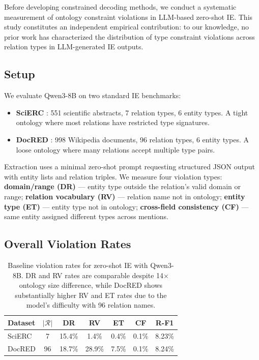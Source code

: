 \documentclass[11pt,a4paper]{article}
\begin{document}
Before developing constrained decoding methods, we conduct a systematic measurement of ontology constraint violations in LLM-based zero-shot IE.
This study constitutes an independent empirical contribution: to our knowledge, no prior work has characterized the distribution of type constraint violations across relation types in LLM-generated IE outputs.

\subsection{Setup}

We evaluate Qwen3-8B \cite{qwen2025qwen3} on two standard IE benchmarks:
\begin{itemize}[leftmargin=*,nosep]
\item \textbf{SciERC} \cite{luan2018multi}: 551 scientific abstracts, 7 relation types, 6 entity types. A tight ontology where most relations have restricted type signatures.
\item \textbf{DocRED} \cite{yao2019docred}: 998 Wikipedia documents, 96 relation types, 6 entity types. A loose ontology where many relations accept multiple type pairs.
\end{itemize}

Extraction uses a minimal zero-shot prompt requesting structured JSON output with entity lists and relation triples.
We measure four violation types: \textbf{domain/range (DR)} --- entity type outside the relation's valid domain or range; \textbf{relation vocabulary (RV)} --- relation name not in ontology; \textbf{entity type (ET)} --- entity type not in ontology; \textbf{cross-field consistency (CF)} --- same entity assigned different types across mentions.

\subsection{Overall Violation Rates}

\begin{table}[t]
\centering
\small
\begin{tabular}{lcccccc}
\toprule
\textbf{Dataset} & $|\mathcal{R}|$ & \textbf{DR} & \textbf{RV} & \textbf{ET} & \textbf{CF} & \textbf{R-F1} \\
\midrule
SciERC & 7 & 15.4\% & 1.4\% & 0.4\% & 0.1\% & 8.23\% \\
DocRED & 96 & 18.7\% & 28.9\% & 7.5\% & 0.1\% & 8.24\% \\
\bottomrule
\end{tabular}
\caption{Baseline violation rates for zero-shot IE with Qwen3-8B. DR and RV rates are comparable despite 14$\times$ ontology size difference, while DocRED shows substantially higher RV and ET rates due to the model's difficulty with 96 relation names.}
\label{tab:baseline-violations}
\end{table}
\end{document}
